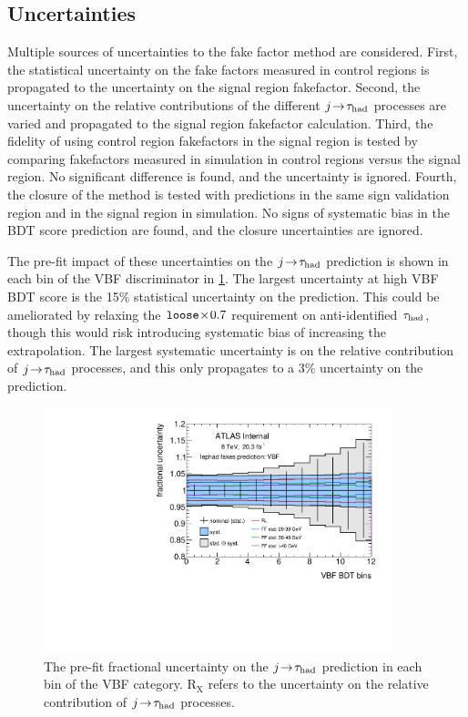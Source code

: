 \clearpage

\subsection{Uncertainties}

Multiple sources of uncertainties to the fake factor method are considered. First, the statistical uncertainty on the fake factors measured in control regions is propagated to the uncertainty on the signal region fakefactor. Second, the uncertainty on the relative contributions of the different $j\!\rightarrow\!\tau_\text{had}$ processes are varied and propagated to the signal region fakefactor calculation. Third, the fidelity of using control region fakefactors in the signal region is tested by comparing fakefactors measured in simulation in control regions versus the signal region. No significant difference is found, and the uncertainty is ignored. Fourth, the closure of the method is tested with predictions in the same sign validation region and in the signal region in simulation. No signs of systematic bias in the BDT score prediction are found, and the closure uncertainties are ignored.

The pre-fit impact of these uncertainties on the $j\!\rightarrow\!\tau_\text{had}$ prediction is shown in each bin of the VBF discriminator in \cref{fig:backgrounds-uncertainties-fakes}. The largest uncertainty at high VBF BDT score is the 15\% statistical uncertainty on the prediction. This could be ameliorated by relaxing the $\texttt{loose}\!\times\!0.7$ requirement on anti-identified $\tau_\text{had}$, though this would risk introducing systematic bias of increasing the extrapolation. The largest systematic uncertainty is on the relative contribution of $j\!\rightarrow\!\tau_\text{had}$ processes, and this only propagates to a 3\% uncertainty on the prediction.

\begin{figure}[tp]
  \includegraphics[width=0.90\textwidth]{figures/uncertainties/uncertainties_lephad_paper14_8TeV_fakes_VBF}
  \caption{The pre-fit fractional uncertainty on the $j\!\rightarrow\!\tau_\text{had}$ prediction in each bin of the VBF category. $\text{R}_\text{X}$ refers to the uncertainty on the relative contribution of $j\!\rightarrow\!\tau_\text{had}$ processes.}
  \label{fig:backgrounds-uncertainties-fakes}
\end{figure}


